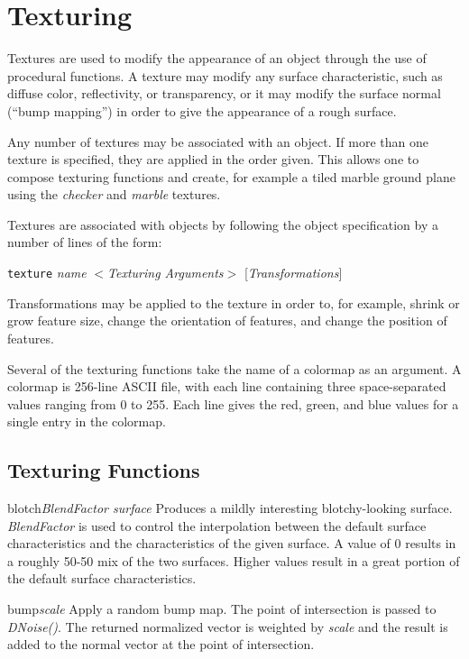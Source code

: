 \chapter {Texturing}

Textures are used to modify the appearance of an object through the
use of procedural functions.  A texture may modify any surface characteristic,
such as diffuse color, reflectivity, or transparency, or it may 
modify the surface normal (``bump mapping'') in order to give the
appearance of a rough surface.

Any number of textures may be associated with an object.  If more than
one texture is specified, they are applied in the order given.  This allows
one to compose texturing functions and create, for example
a tiled marble ground plane using the {\em checker} and {\em marble}
textures.

Textures are associated with objects by following the object specification
by a number of lines of the form:

\begin{center}
{\tt texture} {\em name} $<${\em Texturing Arguments}$>$ [{\em Transformations}]
\end{center}

Transformations may be applied to the texture in order to, for example,
shrink or grow feature size, change the orientation of features, and
change the position of features.

Several of the texturing functions take the name of a colormap as an
argument.  A colormap is 256-line ASCII file, with each line containing
three space-separated values ranging from 0 to 255.  Each line gives
the red, green, and blue values for a single entry in the colormap.

\section {Texturing Functions}

\begin{defkey}{blotch}{{\em BlendFactor surface}}
Produces a mildly interesting blotchy-looking surface.
{\em BlendFactor} is used to control the interpolation between
the default surface characteristics and the characteristics of
the given surface.  A value of 0 results in a roughly 50-50 mix
of the two surfaces.  Higher values result in a great portion of
the default surface characteristics.
\end{defkey}

\begin{defkey}{bump}{{\em scale}}
Apply a random bump map.  The point of intersection is passed to
{\em DNoise()}.
The returned normalized vector is weighted by {\em scale}
and the result is added to the normal vector at the point of intersection.
\end{defkey}

